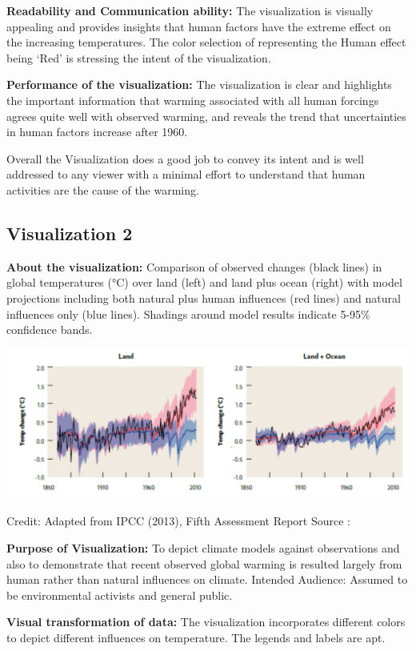 \documentclass[]{book}
\begin{document}
\textbf{Readability and Communication ability:} The visualization is visually appealing and provides insights that human factors have the extreme effect on the increasing temperatures. The color selection of representing the Human effect being `Red' is stressing the intent of the visualization.

\textbf{Performance of the visualization:} The visualization is clear and highlights the important information that warming associated with all human forcings agrees quite well with observed warming, and reveals the trend that uncertainties in human factors increase after 1960.

Overall the Visualization does a good job to convey its intent and is well addressed to any viewer with a minimal effort to understand that human activities are the cause of the warming.

\hypertarget{visualization-2}{%
\subsection{Visualization 2}\label{visualization-2}}

\textbf{About the visualization:} Comparison of observed changes (black lines) in global temperatures (°C) over land (left) and land plus ocean (right) with model projections including both natural plus human influences (red lines) and natural influences only (blue lines). Shadings around model results indicate 5-95\% confidence bands.

\includegraphics{images/Vz3-LandOcean.png}

Credit: Adapted from IPCC (2013), Fifth Assessment Report
Source : \citep{Land_Ocean}

\textbf{Purpose of Visualization:} To depict climate models against observations and also to demonstrate that recent observed global warming is resulted largely from human rather than natural influences on climate.
Intended Audience: Assumed to be environmental activists and general public.

\textbf{Visual transformation of data:} The visualization incorporates different colors to depict different influences on temperature. The legends and labels are apt.
\end{document}
